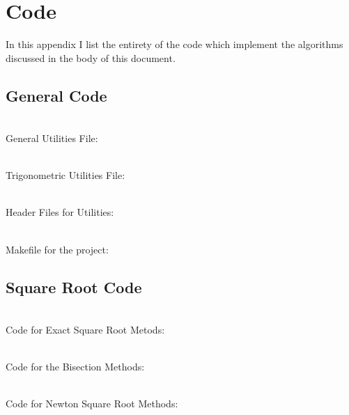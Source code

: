 \section{Code}
\renewcommand{\thelstlisting}{}
\renewcommand{\lstlistingname}{File}

In this appendix I list the entirety of the code which implement the algorithms discussed in the body of this document.

\subsection{General Code}
\label{SUB_"General Code"}

\\General Utilities File:


\\Trigonometric Utilities File:


\\Header Files for Utilities:




\\Makefile for the project:


\subsection{Square Root Code}
\label{SUB_"Square Root Code"}

\\Code for Exact Square Root Metods:


\\Code for the Bisection Methods:


\\Code for Newton Square Root Methods:


